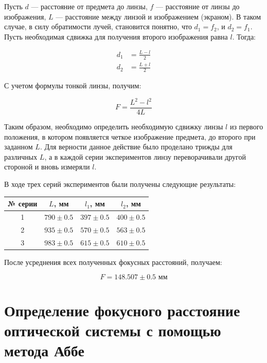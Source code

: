 \documentclass[a4paper, 12pt]{article}
\begin{document}
Пусть $d$ --- расстояние от предмета до линзы, $f$ --- расстояние от линзы до изображения, $L$ --- расстояние между линзой и изображением (экраном). В таком случае, в силу обратимости лучей, становится понятно, что $d_1 = f_2$, и $d_2 = f_1$. Пусть необходимая сдвижка для получения второго изображения равна $l$. Тогда:

\begin{align*}
	d_1 &= \frac{L - l}{2} \\
	d_2 &= \frac{L + l}{2}
\end{align*}

С учетом формулы тонкой линзы, получим:

\begin{equation}
	F = \frac{L^2 - l^2}{4L}
\end{equation}

Таким образом, необходимо определить необходимую сдвижку линзы $l$ из первого положения, в котором появляется четкое изображение предмета, до второго при заданном $L$. Для верности данное действие было проделано трижды для различных $L$, а в каждой серии экспериментов линзу переворачивали другой стороной и вновь измеряли $l$.

В ходе трех серий экспериментов были получены следующие результаты:

\begin{center}
	\begin{tabular}{|c|c|c|c|}
		\hline
		№ серии & $L$, мм & $l_1$, мм & $l_2$, мм \\
		\hline
		1 & $790 \pm 0.5$ & $397 \pm 0.5$ & $400 \pm 0.5$ \\
		\hline
		2 & $935 \pm 0.5$ & $570 \pm 0.5$ & $563 \pm 0.5$ \\
		\hline
		3 & $983 \pm 0.5$ & $615 \pm 0.5$ & $610 \pm 0.5$ \\
		\hline
	\end{tabular}
\end{center}

После усреднения всех полученных фокусных расстояний, получаем: %

\begin{equation*}
	\boxed{
	F = 148.507 \pm 0.5 \text{ мм}}
\end{equation*}

\section{Определение фокусного расстояние оптической системы с помощью метода Аббе}
\end{document}
